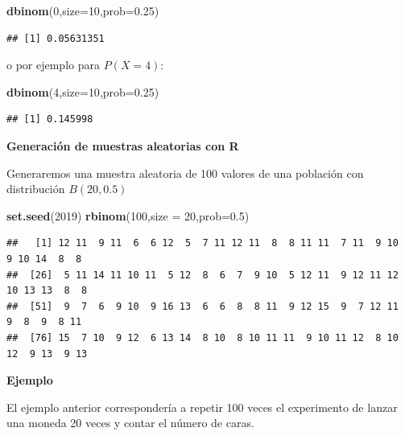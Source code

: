 \documentclass[]{book}
\newenvironment{Shaded}{\begin{snugshade}}{\end{snugshade}}
\newcommand{\DataTypeTok}[1]{\textcolor[rgb]{0.13,0.29,0.53}{#1}}
\newcommand{\DecValTok}[1]{\textcolor[rgb]{0.00,0.00,0.81}{#1}}
\newcommand{\FloatTok}[1]{\textcolor[rgb]{0.00,0.00,0.81}{#1}}
\newcommand{\KeywordTok}[1]{\textcolor[rgb]{0.13,0.29,0.53}{\textbf{#1}}}
\newcommand{\NormalTok}[1]{#1}
\begin{document}
\begin{Shaded}
\begin{Highlighting}[]
\KeywordTok{dbinom}\NormalTok{(}\DecValTok{0}\NormalTok{,}\DataTypeTok{size=}\DecValTok{10}\NormalTok{,}\DataTypeTok{prob=}\FloatTok{0.25}\NormalTok{)}
\end{Highlighting}
\end{Shaded}

\begin{verbatim}
## [1] 0.05631351
\end{verbatim}

o por ejemplo para \(P(X=4)\):

\begin{Shaded}
\begin{Highlighting}[]
\KeywordTok{dbinom}\NormalTok{(}\DecValTok{4}\NormalTok{,}\DataTypeTok{size=}\DecValTok{10}\NormalTok{,}\DataTypeTok{prob=}\FloatTok{0.25}\NormalTok{)}
\end{Highlighting}
\end{Shaded}

\begin{verbatim}
## [1] 0.145998
\end{verbatim}

\textbf{Generación de muestras aleatorias con R}

Generaremos una muestra aleatoria de 100 valores de una población con distribución \(B(20,0.5)\)

\begin{Shaded}
\begin{Highlighting}[]
\KeywordTok{set.seed}\NormalTok{(}\DecValTok{2019}\NormalTok{)}
\KeywordTok{rbinom}\NormalTok{(}\DecValTok{100}\NormalTok{,}\DataTypeTok{size =} \DecValTok{20}\NormalTok{,}\DataTypeTok{prob=}\FloatTok{0.5}\NormalTok{)}
\end{Highlighting}
\end{Shaded}

\begin{verbatim}
##   [1] 12 11  9 11  6  6 12  5  7 11 12 11  8  8 11 11  7 11  9 10  9 10 14  8  8
##  [26]  5 11 14 11 10 11  5 12  8  6  7  9 10  5 12 11  9 12 11 12 10 13 13  8  8
##  [51]  9  7  6  9 10  9 16 13  6  6  8  8 11  9 12 15  9  7 12 11  9  8  9  8 11
##  [76] 15  7 10  9 12  6 13 14  8 10  8 10 11 11  9 10 11 12  8 10 12  9 13  9 13
\end{verbatim}

\textbf{Ejemplo}

El ejemplo anterior correspondería a repetir 100 veces el experimento de lanzar una moneda 20 veces y contar el número de caras.
\end{document}
